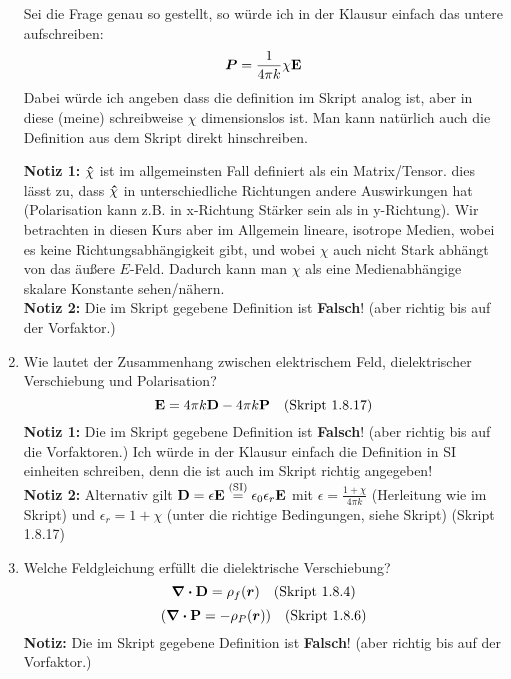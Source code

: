 \begin{enumerate}
        Sei die Frage genau so gestellt, so würde ich in der Klausur einfach
        das untere aufschreiben:
        \begin{equation*}
          \vb*P = \frac{1}{4\pi k}\chi \vb E 
        \end{equation*}
        Dabei würde ich angeben dass die definition im Skript analog ist,
        aber in diese (meine) schreibweise $\chi$ dimensionslos ist. 
        Man kann natürlich auch die Definition aus dem Skript direkt
        hinschreiben.

        \textbf{Notiz 1:} $\vu \chi$ ist im allgemeinsten Fall 
        definiert als ein Matrix/Tensor.
        dies lässt zu, dass $\vu \chi$ in unterschiedliche Richtungen
        andere Auswirkungen hat (Polarisation kann z.B. in x-Richtung
        Stärker sein als in y-Richtung). Wir betrachten in diesen Kurs 
        aber im Allgemein
        lineare, isotrope Medien, wobei es keine Richtungsabhängigkeit
        gibt, und wobei $\chi$ auch nicht Stark abhängt von das äußere
        $E$-Feld. Dadurch kann
        man $\chi$ als eine Medienabhängige skalare Konstante 
        sehen/nähern.\\
        \textbf{Notiz 2:} Die im Skript gegebene Definition ist 
        \textbf{Falsch}! (aber richtig bis auf der Vorfaktor.)\\

  \item Wie lautet der Zusammenhang zwischen elektrischem Feld,  %
        dielektrischer Verschiebung und Polarisation?
        $$\vb E= 4\pi k\vb D - 4\pi k\vb P \quad\text{(Skript 1.8.17)}$$
        \textbf{Notiz 1:} Die im Skript gegebene Definition ist 
        \textbf{Falsch}! (aber richtig bis auf die Vorfaktoren.)
        Ich würde in der Klausur einfach die Definition in SI einheiten
        schreiben, denn die ist auch im Skript richtig angegeben!\\
        \textbf{Notiz 2:} Alternativ gilt $\vb D=\epsilon \vb E
        \stackrel{\text{(SI)}}=\epsilon_0\epsilon_r \vb E$ mit
        $\epsilon=\frac{1+\chi}{4\pi k}$ (Herleitung wie im Skript) und
        $\epsilon_r=1+\chi$
        (unter die richtige Bedingungen, siehe Skript) (Skript 1.8.17)\\

  \item Welche Feldgleichung erfüllt die dielektrische Verschiebung? %
        $$\div \vb D=\rho_f(\vb* r)\quad\text{(Skript 1.8.4)}$$
        $$\qty(\div \vb P=-\rho_P(\vb* r))\quad\text{(Skript 1.8.6)}$$
        \textbf{Notiz:} Die im Skript gegebene Definition ist 
        \textbf{Falsch}! (aber richtig bis auf der Vorfaktor.)


\end{enumerate}
